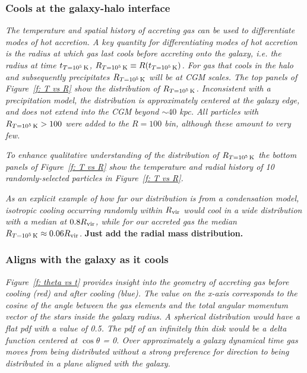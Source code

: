 \documentclass[fleqn,usenatbib]{mnras}
\newcommand{\Rcon}{R_{T=10^5\,{\rm K}}}
\newcommand{\tcon}{t_{T=10^5\,{\rm K}}}
\begin{document}
\subsubsection{Cools at the galaxy-halo interface}
\label{s: characteristics -- cools}

\textit{
The temperature and spatial history of accreting gas can be used to differentiate modes of hot accretion.
A key quantity for differentiating modes of hot accretion is the radius at which gas last cools before accreting onto the galaxy, i.e. the radius at time $\tcon$, $\Rcon \equiv R (\tcon)$.
For gas that cools in the halo and subsequently precipitates $\Rcon$ will be at CGM scales.
The top panels of Figure~\ref{f: T vs R} show the distribution of  $\Rcon$.
Inconsistent with a precipitation model, the distribution is approximately centered at the galaxy edge, and does not extend into the CGM beyond $\sim 40$ kpc.
All particles with $\Rcon>100$  were added to the $R=100$ bin, although these amount to very few.
}

\textit{
To enhance qualitative understanding of the distribution of $\Rcon$ the bottom panels of Figure~\ref{f: T vs R} show the temperature and radial history of 10 randomly-selected particles in Figure~\ref{f: T vs R}.
}

\textit{
As an explicit example of how far our distribution is from a condensation model, isotropic cooling occurring randomly within $R_{\rm vir}$ would cool in a wide distribution with a median at $0.8 R_{\rm vir}$, while for our accreted gas the median $\Rcon \approx 0.06 R_{\rm vir}$.
}
\textbf{Just add the radial mass distribution.}

\subsubsection{Aligns with the galaxy as it cools}
\label{s: characteristics -- aligns}

\textit{
Figure~\ref{f: theta vs t} provides insight into the geometry of accreting gas before cooling (red) and after cooling (blue).
The value on the x-axis corresponds to the cosine of the angle between the gas elements and the total angular momentum vector of the stars inside the galaxy radius.
A spherical distribution would have a flat pdf with a value of 0.5.
The pdf of an infinitely thin disk would be a delta function centered at $\cos\theta$ = 0.
Over approximately a galaxy dynamical time gas moves from being distributed without a strong preference for direction to being distributed in a plane aligned with the galaxy.
}
\end{document}
